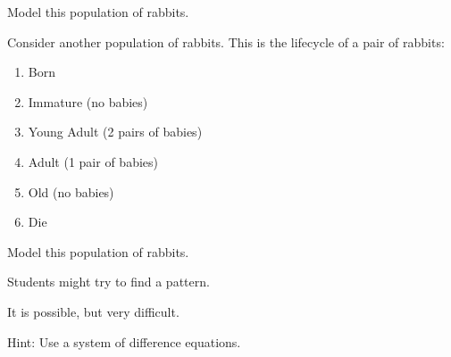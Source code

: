 	Model this population of rabbits.
	
	


\bookonlynewpage


\question
	Consider another population of rabbits. This is the lifecycle of a pair of rabbits:
	\begin{enumerate}[start=0,label=(year \arabic*)]
		\item Born
		\item Immature (no babies)
		\item Young Adult (2 pairs of babies)
		\item Adult (1 pair of babies)
		\item Old (no babies)
		\item Die
	\end{enumerate}	
	
	Model this population of rabbits.
	
\begin{annotation}
	\begin{goals}
		Students might try to find a pattern. 
		
		It is possible, but very difficult.
		
		Hint: Use a system of difference equations.
	\end{goals}
\end{annotation}
	


%
%
%
%
%
%
%
%	
%	
%
%
%
%
%	
%
%
%
%
%
%
%
%
%




